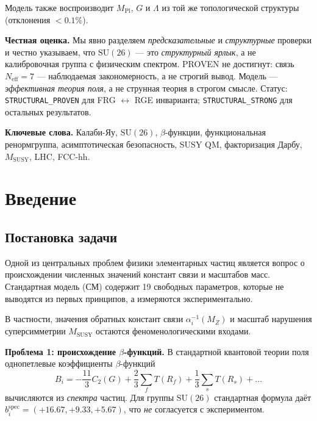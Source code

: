 \documentclass[11pt,a4paper]{article}
\newcommand{\SU}{\ensuremath{\mathrm{SU}}}
\newcommand{\MSUSY}{\ensuremath{M_{\text{SUSY}}}}
\theoremstyle{definition}
\begin{document}
Модель также воспроизводит $M_{\text{Pl}}$, $G$ и $\Lambda$
из той же топологической структуры (отклонения $< 0.1\%$).

\medskip\noindent
\textbf{Честная оценка.}
Мы явно разделяем \emph{предсказательные} и \emph{структурные} проверки
и честно указываем, что $\mathrm{SU}(26)$ --- это \emph{структурный ярлык},
а не калибровочная группа с физическим спектром.
PROVEN не достигнут: связь $N_{\text{eff}} = 7$ --- наблюдаемая
закономерность, а не строгий вывод.
Модель --- \emph{эффективная теория поля}, а не струнная теория
в строгом смысле.
Статус: \texttt{STRUCTURAL\_PROVEN} для FRG $\leftrightarrow$ RGE
инварианта; \texttt{STRUCTURAL\_STRONG} для остальных результатов.

\medskip\noindent
\textbf{Ключевые слова.}
Калаби-Яу, $\mathrm{SU}(26)$, $\beta$-функции, функциональная
ренормгруппа, асимптотическая безопасность, SUSY QM, факторизация
Дарбу, $M_{\text{SUSY}}$, LHC, FCC-hh.


\newpage
\tableofcontents
\newpage

\section{Введение}
\label{sec:intro}

\subsection{Постановка задачи}

Одной из центральных проблем физики элементарных частиц является
вопрос о происхождении численных значений констант связи и
масштабов масс. Стандартная модель (СМ) содержит 19 свободных
параметров, которые не выводятся из первых принципов,
а измеряются экспериментально.

В частности, значения обратных констант связи $\alpha_i^{-1}(M_Z)$
и масштаб нарушения суперсимметрии $\MSUSY$ остаются
феноменологическими входами.

\medskip\noindent
\textbf{Проблема 1: происхождение $\beta$-функций.}
В стандартной квантовой теории поля однопетлевые коэффициенты
$\beta$-функций
\begin{equation}
    B_i = -\frac{11}{3} C_2(G) + \frac{2}{3} \sum_f T(R_f)
    + \frac{1}{3} \sum_s T(R_s) + \ldots
    \label{eq:beta-standard}
\end{equation}
вычисляются из \emph{спектра} частиц. Для группы $\SU(26)$
стандартная формула даёт $b_i^{\text{spec}} = (+16.67, +9.33, +5.67)$,
что \emph{не} согласуется с экспериментом.
\end{document}
